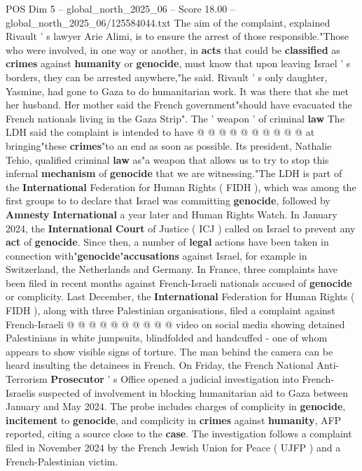 \begin{textsample}{POS Dim 5 – global\_north\_2025\_06 – Score 18.00 – global\_north\_2025\_06/125584044.txt}
The aim of the complaint, explained Rivault ' s lawyer Arie Alimi, is to ensure the arrest of those responsible."Those who were involved, in one way or another, in \textbf{acts} that could be \textbf{classified} as \textbf{crimes} against \textbf{humanity} or \textbf{genocide}, must know that upon leaving Israel ' s borders, they can be arrested anywhere,"he said.
Rivault ' s only daughter, Yasmine, had gone to Gaza to do humanitarian work.
It was there that she met her husband.
Her mother said the French government"should have evacuated the French nationals living in the Gaza Strip".
The ' weapon ' of criminal \textbf{law} The LDH said the complaint is intended to have @ @ @ @ @ @ @ @ @ @ at bringing"these \textbf{crimes}"to an end as soon as possible.
Its president, Nathalie Tehio, qualified criminal \textbf{law} as"a weapon that allows us to try to stop this infernal \textbf{mechanism} of \textbf{genocide} that we are witnessing."The LDH is part of the \textbf{International} Federation for Human Rights ( FIDH ), which was among the first groups to to declare that Israel was committing \textbf{genocide}, followed by \textbf{Amnesty} \textbf{International} a year later and Human Rights Watch.
In January 2024, the \textbf{International} \textbf{Court} of Justice ( ICJ ) called on Israel to prevent any \textbf{act} of \textbf{genocide}.
Since then, a number of \textbf{legal} actions have been taken in connection with"\textbf{genocide}"\textbf{accusations} against Israel, for example in Switzerland, the Netherlands and Germany.
In France, three complaints have been filed in recent months against French-Israeli nationals accused of \textbf{genocide} or complicity.
Last December, the \textbf{International} Federation for Human Rights ( FIDH ), along with three Palestinian organisations, filed a complaint against French-Israeli @ @ @ @ @ @ @ @ @ @ video on social media showing detained Palestinians in white jumpsuits, blindfolded and handcuffed - one of whom appears to show visible signs of torture.
The man behind the camera can be heard insulting the detainees in French.
On Friday, the French National Anti-Terrorism \textbf{Prosecutor} ' s Office opened a judicial investigation into French-Israelis suspected of involvement in blocking humanitarian aid to Gaza between January and May 2024.
The probe includes charges of complicity in \textbf{genocide}, \textbf{incitement} to \textbf{genocide}, and complicity in \textbf{crimes} against \textbf{humanity}, AFP reported, citing a source close to the \textbf{case}.
The investigation follows a complaint filed in November 2024 by the French Jewish Union for Peace ( UJFP ) and a French-Palestinian victim.

\end{textsample}
